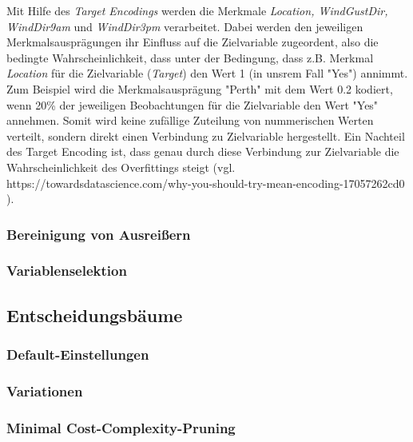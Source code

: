 \noindent \hspace*{7mm}
Mit Hilfe des \emph{Target Encodings} werden die Merkmale \emph{Location, WindGustDir, WindDir9am} und \emph{WindDir3pm} verarbeitet. Dabei werden den jeweiligen Merkmalsausprägungen ihr Einfluss auf die Zielvariable zugeordent, also die bedingte Wahrscheinlichkeit, dass unter der Bedingung, dass z.B. Merkmal \emph{Location} für die Zielvariable (\emph{Target}) den Wert 1 (in unsrem Fall "Yes") annimmt. Zum Beispiel wird die Merkmalsausprägung "Perth" mit dem Wert 0.2 kodiert, wenn 20\% der jeweiligen Beobachtungen für die Zielvariable den Wert "Yes"  annehmen.  Somit wird keine zufällige Zuteilung von nummerischen Werten verteilt, sondern direkt einen Verbindung zu Zielvariable hergestellt. Ein Nachteil des Target Encoding ist, dass genau durch diese Verbindung zur Zielvariable die Wahrscheinlichkeit des Overfittings steigt (vgl. https://towardsdatascience.com/why-you-should-try-mean-encoding-17057262cd0   ).

\subsubsection{Bereinigung von Ausreißern}

\subsubsection{Variablenselektion}


\vspace{1cm}
\subsection{Entscheidungsbäume}
\subsubsection{Default-Einstellungen}
\subsubsection{Variationen}
\subsubsection{Minimal Cost-Complexity-Pruning}
